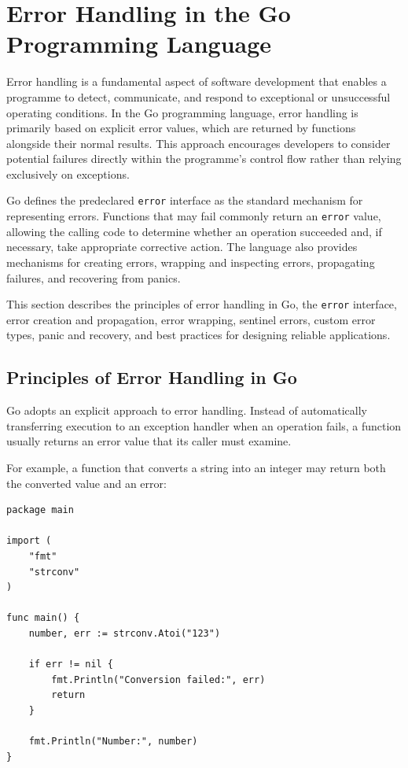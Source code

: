 \section{Error Handling in the Go Programming Language}

Error handling is a fundamental aspect of software development that enables a programme to detect, communicate, and respond to exceptional or unsuccessful operating conditions. In the Go programming language, error handling is primarily based on explicit error values, which are returned by functions alongside their normal results. This approach encourages developers to consider potential failures directly within the programme's control flow rather than relying exclusively on exceptions.

Go defines the predeclared \texttt{error} interface as the standard mechanism for representing errors. Functions that may fail commonly return an \texttt{error} value, allowing the calling code to determine whether an operation succeeded and, if necessary, take appropriate corrective action. The language also provides mechanisms for creating errors, wrapping and inspecting errors, propagating failures, and recovering from panics.

This section describes the principles of error handling in Go, the \texttt{error} interface, error creation and propagation, error wrapping, sentinel errors, custom error types, panic and recovery, and best practices for designing reliable applications.

\subsection{Principles of Error Handling in Go}

Go adopts an explicit approach to error handling. Instead of automatically transferring execution to an exception handler when an operation fails, a function usually returns an error value that its caller must examine.

For example, a function that converts a string into an integer may return both the converted value and an error:

\begin{lstlisting}
package main

import (
    "fmt"
    "strconv"
)

func main() {
    number, err := strconv.Atoi("123")

    if err != nil {
        fmt.Println("Conversion failed:", err)
        return
    }

    fmt.Println("Number:", number)
}
\end{lstlisting}

